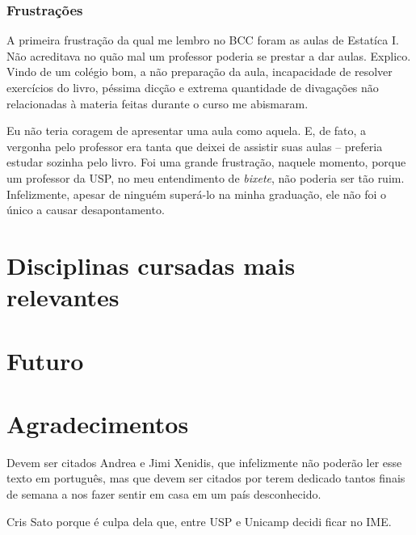\documentclass[titlepage,a4paper]{article}
\begin{document}
\subsubsection*{Frustrações}

A primeira frustração da qual me lembro no BCC foram as aulas de Estatíca I. Não acreditava no quão mal um professor poderia se prestar a dar aulas. Explico. Vindo de um colégio bom, a não preparação da aula, incapacidade de resolver exercícios do livro, péssima dicção e extrema quantidade de divagações não relacionadas à materia feitas durante o curso me abismaram. 

Eu não teria coragem de apresentar uma aula como aquela. E, de fato, a vergonha pelo professor era tanta que deixei de assistir suas aulas -- preferia estudar sozinha pelo livro. Foi uma grande frustração, naquele momento, porque um professor da USP, no meu entendimento de \textit{bixete}, não poderia ser tão ruim. Infelizmente, apesar de ninguém superá-lo na minha graduação, ele não foi o único a causar desapontamento.



\section{Disciplinas cursadas mais relevantes}


\section{Futuro}

\section{Agradecimentos}

Devem ser citados Andrea e Jimi Xenidis, que infelizmente não poderão ler esse texto em português, mas que devem ser citados por terem dedicado tantos finais de semana a nos fazer sentir em casa em um país desconhecido.

Cris Sato porque é culpa dela que, entre USP e Unicamp decidi ficar no IME.
\end{document}
